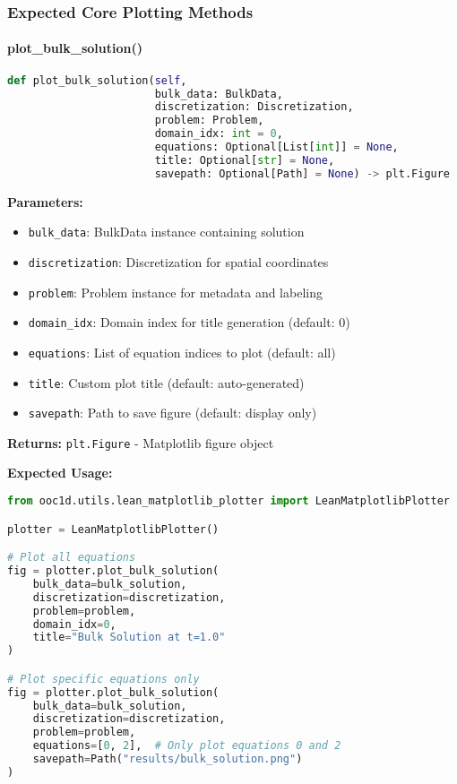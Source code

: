 \subsubsection{Expected Core Plotting Methods}

\paragraph{plot\_bulk\_solution()}\leavevmode
\begin{lstlisting}[language=Python, caption=Expected Bulk Solution Plotting Method]
def plot_bulk_solution(self,
                       bulk_data: BulkData,
                       discretization: Discretization,
                       problem: Problem,
                       domain_idx: int = 0,
                       equations: Optional[List[int]] = None,
                       title: Optional[str] = None,
                       savepath: Optional[Path] = None) -> plt.Figure
\end{lstlisting}

\textbf{Parameters:}
\begin{itemize}
    \item \texttt{bulk\_data}: BulkData instance containing solution
    \item \texttt{discretization}: Discretization for spatial coordinates
    \item \texttt{problem}: Problem instance for metadata and labeling
    \item \texttt{domain\_idx}: Domain index for title generation (default: 0)
    \item \texttt{equations}: List of equation indices to plot (default: all)
    \item \texttt{title}: Custom plot title (default: auto-generated)
    \item \texttt{savepath}: Path to save figure (default: display only)
\end{itemize}

\textbf{Returns:} \texttt{plt.Figure} - Matplotlib figure object

\textbf{Expected Usage:}
\begin{lstlisting}[language=Python, caption=Bulk Solution Plotting Usage]
from ooc1d.utils.lean_matplotlib_plotter import LeanMatplotlibPlotter

plotter = LeanMatplotlibPlotter()

# Plot all equations
fig = plotter.plot_bulk_solution(
    bulk_data=bulk_solution,
    discretization=discretization,
    problem=problem,
    domain_idx=0,
    title="Bulk Solution at t=1.0"
)

# Plot specific equations only
fig = plotter.plot_bulk_solution(
    bulk_data=bulk_solution,
    discretization=discretization,
    problem=problem,
    equations=[0, 2],  # Only plot equations 0 and 2
    savepath=Path("results/bulk_solution.png")
)
\end{lstlisting}

